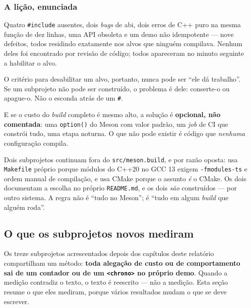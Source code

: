 \subsubsection{A lição, enunciada}

\begin{regra}
Quatro \texttt{\#include} ausentes, dois \emph{bugs} de \gls{abi}, dois erros
de C++ puro na mesma função de dez linhas, uma API obsoleta e um demo não
idempotente --- nove defeitos, todos residindo
exatamente nos alvos que ninguém compilava. Nenhum deles foi encontrado por
revisão de código; todos apareceram no minuto seguinte a habilitar o alvo.

O critério para desabilitar um alvo, portanto, nunca pode ser ``ele dá
trabalho''. Se um subprojeto não pode ser construído, o problema é dele:
conserte-o ou apague-o. Não o esconda atrás de um \texttt{\#}.

E se o custo do \emph{build} completo é mesmo alto, a solução é
\textbf{opcional, não comentada}: uma \texttt{option()} do Meson com valor
padrão, um \emph{job} de CI que constrói tudo, uma etapa noturna. O que não
pode existir é código que \emph{nenhuma} configuração compila.
\end{regra}

\begin{aviso}
Dois subprojetos continuam fora do \texttt{src/meson.build}, e por razão
oposta:  usa \texttt{Makefile} próprio porque módulos do C++20
no GCC 13 exigem \texttt{-fmodules-ts} e ordem manual de compilação, e
 usa CMake porque o assunto \emph{é} o CMake. Os dois documentam
a escolha no próprio \texttt{README.md}, e os dois \emph{são} construídos ---
por outro sistema. A regra não é ``tudo no Meson''; é ``tudo em algum
\emph{build} que alguém roda''.
\end{aviso}

\subsection{O que os subprojetos novos mediram}
\label{sec:medicoes-novas}

Os treze subprojetos acrescentados depois dos capítulos deste relatório
compartilham um método: \textbf{toda alegação de custo ou de comportamento sai
de um contador ou de um \texttt{<chrono>} no próprio demo}. Quando a medição
contradiz o texto, o texto é reescrito --- não a medição. Esta seção resume o
que eles mediram, porque vários resultados mudam o que se deve escrever.

